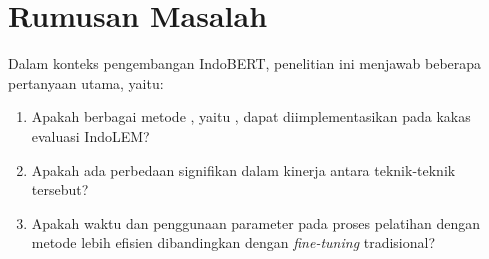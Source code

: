 \section{Rumusan Masalah}

Dalam konteks pengembangan IndoBERT, penelitian ini  menjawab beberapa pertanyaan utama, yaitu:

\begin{enumerate}
    \item Apakah berbagai metode \PEFT, yaitu \methodPEFT, dapat diimplementasikan pada kakas evaluasi IndoLEM?
    \item Apakah ada perbedaan signifikan dalam kinerja antara teknik-teknik \PEFT tersebut?
    \item Apakah waktu dan penggunaan parameter pada proses pelatihan dengan metode \PEFT lebih efisien dibandingkan dengan \textit{fine-tuning} tradisional?
\end{enumerate}
